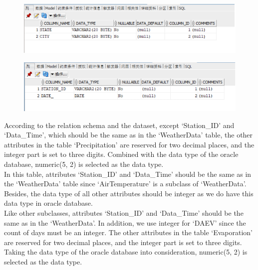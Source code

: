 \documentclass[]{article}
\begin{document}
	\begin{figure}[H]
		\centering
		\includegraphics[width=0.7\linewidth]{../d3-p/part2-2}
		\caption{}
		\label{fig:part2-2}
	\end{figure}
	
	\begin{figure}[H]
		\centering
		\includegraphics[width=0.7\linewidth]{../d3-p/part2-3}
		\caption{}
		\label{fig:part2-3}
	\end{figure}
	

	\noindent According to the relation schema and the dataset, except ‘Station\_ID’ and ‘Data\_Time’, which should be the same as in the ‘WeatherData’ table, the other attributes in the table ‘Precipitation’ are reserved for two decimal places, and the integer part is set to three digits. Combined with the data type of the oracle database, numeric(5, 2) is selected as the data type.  \\
	
	\noindent In this table, attributes ‘Station\_ID’ and ‘Data\_Time’ should be the same as in the ‘WeatherData’ table since ‘AirTemperature’ is a subclass of ‘WeatherData’. Besides, the data type of all other attributes should be integer as we do have this data type in oracle database.   \\
	
	\noindent Like other subclasses, attributes ‘Station\_ID’ and ‘Data\_Time’ should be the same as in the ‘WeatherData’. In addition, we use integer for ‘DAEV’ since the count of days must be an integer. The other attributes in the table ‘Evaporation’ are reserved for two decimal places, and the integer part is set to three digits. Taking the data type of the oracle database into consideration, numeric(5, 2) is selected as the data type.  \\
\end{document}

